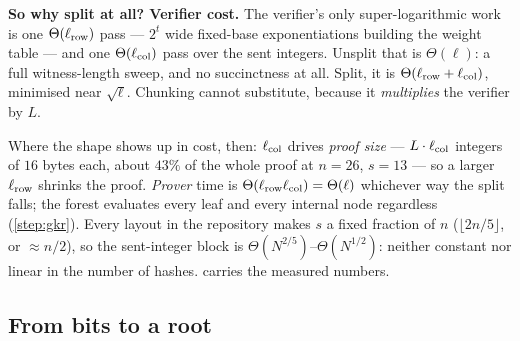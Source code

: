 \textbf{So why split at all? Verifier cost.} The verifier's only
super-logarithmic work is one $\Theta(\ell_{\mathrm{row}})$ pass --- $2^{t}$ wide fixed-base
exponentiations building the weight table 
--- and one $\Theta(\ell_{\mathrm{col}})$ pass over the sent integers. Unsplit that is
$\Theta(\ell)$: a full witness-length sweep, and no succinctness at all. Split,
it is $\Theta(\ell_{\mathrm{row}}+\ell_{\mathrm{col}})$, minimised near $\sqrt\ell$. Chunking cannot
substitute, because it \emph{multiplies} the verifier by $L$.

Where the shape shows up in cost, then: $\ell_{\mathrm{col}}$ drives \emph{proof size} ---
$L\cdot\ell_{\mathrm{col}}$ integers of $16$ bytes each, about $43\%$ of the whole proof at
$n=26$, $s=13$ --- so a larger $\ell_{\mathrm{row}}$ shrinks the proof. \emph{Prover} time is
$\Theta(\ell_{\mathrm{row}}\ell_{\mathrm{col}})=\Theta(\ell)$ whichever way the split falls; the forest
evaluates every leaf and every internal node regardless (\cref{step:gkr}).
Every layout in the repository makes $s$ a fixed fraction of $n$ ($\lfloor
2n/5\rfloor$, or $\approx n/2$), so the sent-integer block is
$\Theta(N^{2/5})$--$\Theta(N^{1/2})$: neither constant nor linear in the number
of hashes.  carries the measured numbers.

\subsection{From bits to a root}

